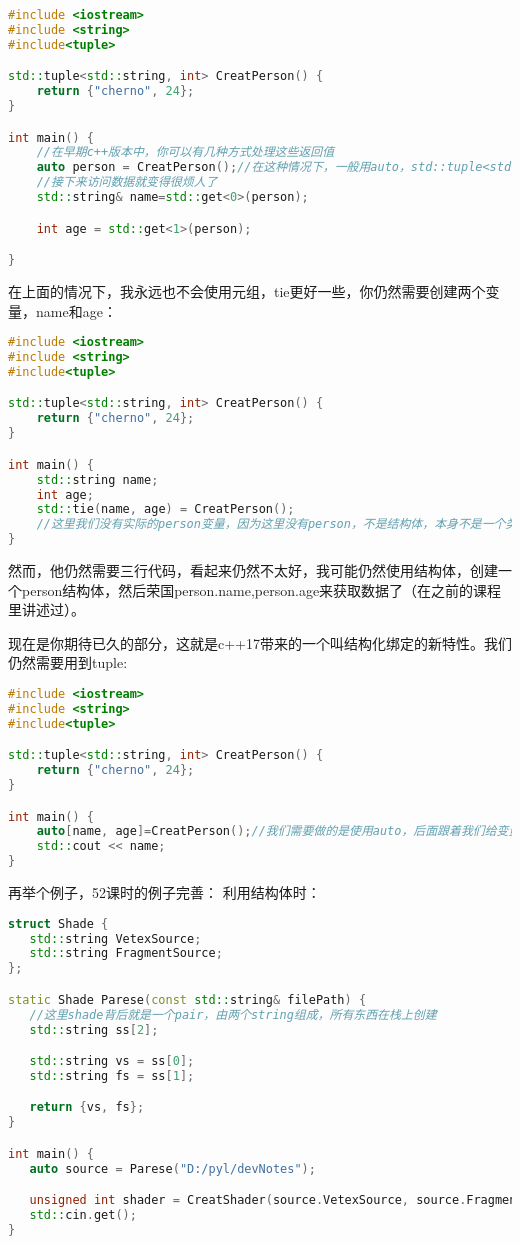 \begin{lstlisting}[language=c++]
#include <iostream>
#include <string>
#include<tuple>

std::tuple<std::string, int> CreatPerson() {
    return {"cherno", 24};
}

int main() {
    //在早期c++版本中，你可以有几种方式处理这些返回值
    auto person = CreatPerson();//在这种情况下，一般用auto，std::tuple<std::string,int>person=CreatPerson();
    //接下来访问数据就变得很烦人了
    std::string& name=std::get<0>(person);

    int age = std::get<1>(person);

}
\end{lstlisting}

在上面的情况下，我永远也不会使用元组，{\ncodestyle tie}更好一些，你仍然需要创建两个变量，{\ncodestyle name}和{\ncodestyle age}：

\begin{lstlisting}[language=c++]
#include <iostream>
#include <string>
#include<tuple>

std::tuple<std::string, int> CreatPerson() {
    return {"cherno", 24};
}

int main() {
    std::string name;
    int age;
    std::tie(name, age) = CreatPerson();
    //这里我们没有实际的person变量，因为这里没有person，不是结构体，本身不是一个类型，他只是一个容器，用来存放我们想要的东西，包含了一个string和一个int
}
\end{lstlisting}

然而，他仍然需要三行代码，看起来仍然不太好，我可能仍然使用结构体，创建一个person结构体，然后荣国person.name,person.age来获取数据了（在之前的课程里讲述过）。

现在是你期待已久的部分，这就是c++17带来的一个叫结构化绑定的新特性。我们仍然需要用到{\ncodestyle tuple}:

\begin{lstlisting}[language=c++]
#include <iostream>
#include <string>
#include<tuple>

std::tuple<std::string, int> CreatPerson() {
    return {"cherno", 24};
}

int main() {
    auto[name, age]=CreatPerson();//我们需要做的是使用auto，后面跟着我们给变量的两个名字，这样我们就可以给他取任何我们想要的名字
    std::cout << name;
}
\end{lstlisting}

再举个例子，52课时的例子完善：
利用结构体时：

\begin{lstlisting}[language=c++]
struct Shade {
   std::string VetexSource;
   std::string FragmentSource;
};

static Shade Parese(const std::string& filePath) {
   //这里shade背后就是一个pair，由两个string组成，所有东西在栈上创建
   std::string ss[2];

   std::string vs = ss[0];
   std::string fs = ss[1];

   return {vs, fs};
}

int main() {
   auto source = Parese("D:/pyl/devNotes");

   unsigned int shader = CreatShader(source.VetexSource, source.FragmentSource);
   std::cin.get();
}
\end{lstlisting}


